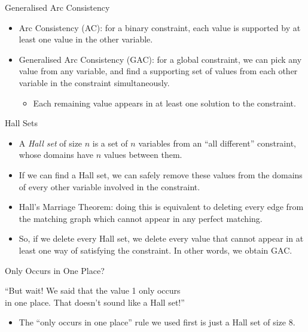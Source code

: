 \documentclass[aspectratio=169,compress,10pt]{beamer}
\begin{document}
\begin{frame}{Generalised Arc Consistency}
    \begin{itemize}
        \item Arc Consistency (AC): for a binary constraint, each value is supported by at least one
            value in the other variable.
        \item Generalised Arc Consistency (GAC): for a global constraint, we can pick any value from any
            variable, and find a supporting set of values from each other variable in the constraint
            simultaneously.
            \begin{itemize}
                \item Each remaining value appears in at least one solution to the constraint.
            \end{itemize}
    \end{itemize}
\end{frame}

\begin{frame}{Hall Sets}
    \begin{itemize}
        \item A \emph{Hall set} of size $n$ is a set of $n$ variables from an ``all different''
            constraint, whose domains have $n$ values between them.

        \item If we can find a Hall set, we can safely remove these values from the domains of every
            other variable involved in the constraint.

        \item Hall's Marriage Theorem: doing this is equivalent to deleting every edge from the
            matching graph which cannot appear in any perfect matching.

        \item So, if we delete every Hall set, we delete every value that cannot appear in at least
            one way of satisfying the constraint. In other words, we obtain GAC.
    \end{itemize}
\end{frame}

\begin{frame}{Only Occurs in One Place?}

    \begin{center}
        ``But wait! We said that the value 1 only occurs \\
        in one place. That doesn't sound like a Hall set!''
    \end{center}

    \begin{itemize}
        \item <2-> The ``only occurs in one place'' rule we used first is just a Hall set of size 8.
    \end{itemize}
\end{frame}
\end{document}

